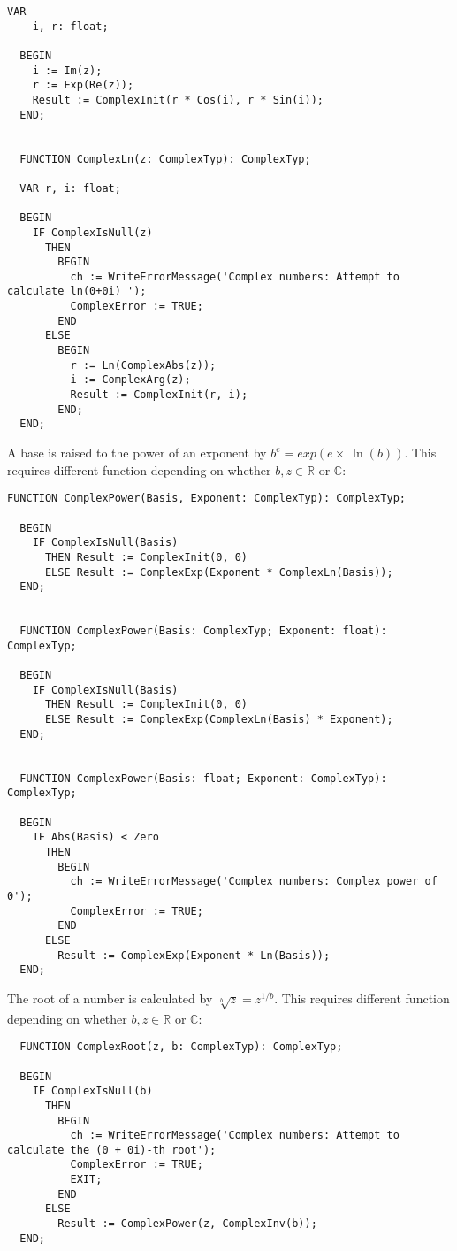 \begin{refsection}
\begin{lstlisting}[caption=Logarithm and exponential function]
  VAR
    i, r: float;

  BEGIN
    i := Im(z);
    r := Exp(Re(z));
    Result := ComplexInit(r * Cos(i), r * Sin(i));
  END;


  FUNCTION ComplexLn(z: ComplexTyp): ComplexTyp;

  VAR r, i: float;

  BEGIN
    IF ComplexIsNull(z)
      THEN
        BEGIN
          ch := WriteErrorMessage('Complex numbers: Attempt to calculate ln(0+0i) ');
          ComplexError := TRUE;
        END
      ELSE
        BEGIN
          r := Ln(ComplexAbs(z));
          i := ComplexArg(z);
          Result := ComplexInit(r, i);
        END;
  END;
\end{lstlisting}

A base is raised to the power of an exponent by \(b^e = exp(e \times\ \ln(b)) \). This requires different function depending on whether \(b, z \in \mathbb{R} \) or \(\mathbb{C} \):

\begin{lstlisting}[caption=complex power function]
  FUNCTION ComplexPower(Basis, Exponent: ComplexTyp): ComplexTyp;

  BEGIN
    IF ComplexIsNull(Basis)
      THEN Result := ComplexInit(0, 0)
      ELSE Result := ComplexExp(Exponent * ComplexLn(Basis));
  END;


  FUNCTION ComplexPower(Basis: ComplexTyp; Exponent: float): ComplexTyp;

  BEGIN
    IF ComplexIsNull(Basis)
      THEN Result := ComplexInit(0, 0)
      ELSE Result := ComplexExp(ComplexLn(Basis) * Exponent);
  END;


  FUNCTION ComplexPower(Basis: float; Exponent: ComplexTyp): ComplexTyp;

  BEGIN
    IF Abs(Basis) < Zero
      THEN
        BEGIN
          ch := WriteErrorMessage('Complex numbers: Complex power of 0');
          ComplexError := TRUE;
        END
      ELSE
        Result := ComplexExp(Exponent * Ln(Basis));
  END;
\end{lstlisting}

The root of a number is calculated by \(\sqrt[b]{z} = z^{1/b} \). This requires different function depending on whether \(b, z \in \mathbb{R} \) or \(\mathbb{C} \):

\begin{lstlisting}
  FUNCTION ComplexRoot(z, b: ComplexTyp): ComplexTyp;

  BEGIN
    IF ComplexIsNull(b)
      THEN
        BEGIN
          ch := WriteErrorMessage('Complex numbers: Attempt to calculate the (0 + 0i)-th root');
          ComplexError := TRUE;
          EXIT;
        END
      ELSE
        Result := ComplexPower(z, ComplexInv(b));
  END;



\end{lstlisting}
\end{refsection}
